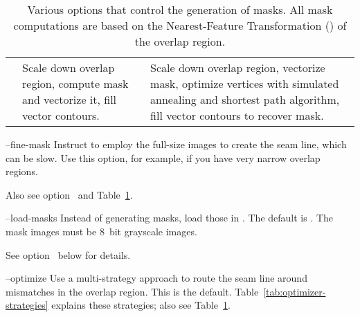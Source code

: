 \begin{codelist}
\begin{table}[htbp]
\begin{tabular}{lp{.3\linewidth}p{.4\linewidth}}
      \option{--coarse-mask} & Scale down overlap region, compute
      \acronym{NFT} mask and vectorize it, fill vector contours. &
      Scale down overlap region, vectorize \acronym{NFT} mask,
      optimize vertices with simulated annealing and
      \propername{Dijkstra's} shortest path algorithm, fill vector
      contours to recover mask.
    \end{tabular}

    \caption[Mask generation options]{Various options that control the
      generation of masks.  All mask computations are based on the
      Nearest-Feature Transformation () of the overlap
      region.\label{tab:mask-generation}}

  \end{table}


  \label{opt:fine-mask}%
\item[--fine-mask]\itemend Instruct \App{} to employ the
  full-size images to
  create the seam line, which can be slow.  Use this option, for
  example, if you have very narrow overlap regions.

  Also see option~ and
  Table~\ref{tab:mask-generation}.


  \label{opt:load-masks}%
\item[--load-masks\optional{=\metavar{IMAGE-TEMPLATE}}]\itemend
  Instead of generating masks, load those in .  The
  default is \mbox{}.  The
  mask images must be 8~bit grayscale images.

  See option~ below for details.


  \label{opt:optimize}%
\item[--optimize]\itemend Use a multi-strategy approach to
  route
  the seam line around mismatches in the overlap region.  This is the
  default.  Table~\ref{tab:optimizer-strategies} explains these
  strategies; also see Table~\ref{tab:mask-generation}.


\end{codelist}
